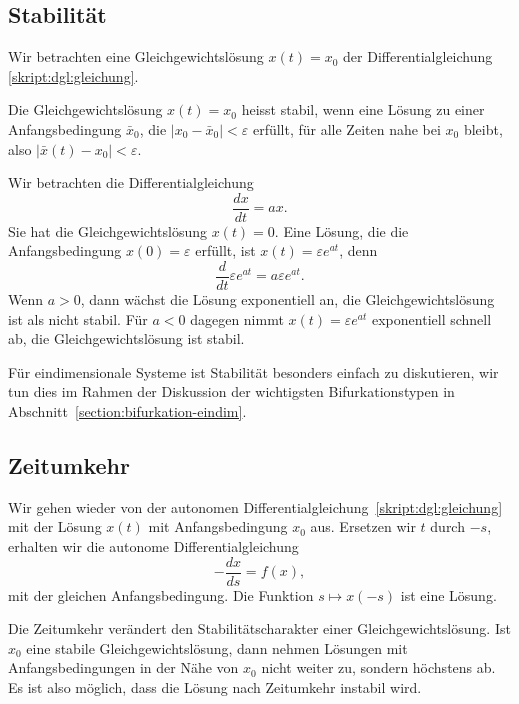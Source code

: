\subsection{Stabilität}
Wir betrachten eine Gleichgewichtslösung $x(t)=x_0$ der Differentialgleichung
\eqref{skript:dgl:gleichung}.
\begin{definition}
Die Gleichgewichtslösung $x(t)=x_0$ heisst stabil, wenn eine Lösung zu
einer Anfangsbedingung $\bar x_0$, die $|x_0-\bar x_0|<\varepsilon$
erfüllt, für alle Zeiten nahe bei $x_0$ bleibt, also
$|\bar x(t)- x_0|<\varepsilon$.
\end{definition}
%

\begin{beispiel}
Wir betrachten die Differentialgleichung
\[
\frac{dx}{dt} = ax.
\]
Sie hat die Gleichgewichtslösung $x(t)=0$.
Eine Lösung, die die Anfangsbedingung $x(0)=\varepsilon$ erfüllt, 
ist $x(t)=\varepsilon e^{at}$, denn
\[
\frac{d}{dt}
\varepsilon e^{at}
=
a\varepsilon e^{at}.
\]
Wenn $a>0$, dann wächst die Lösung exponentiell an, die Gleichgewichtslösung 
ist als nicht stabil.
Für $a<0$ dagegen nimmt $x(t)=\varepsilon e^{at}$ exponentiell schnell ab,
die Gleichgewichtslösung ist stabil.
\end{beispiel}

Für eindimensionale Systeme ist Stabilität besonders einfach zu
diskutieren, wir tun dies im Rahmen der Diskussion der wichtigsten
Bifurkationstypen in Abschnitt~\ref{section:bifurkation-eindim}.

\subsection{Zeitumkehr}
%
Wir gehen wieder von der autonomen
Differentialgleichung~\eqref{skript:dgl:gleichung}
mit der Lösung $x(t)$ mit Anfangsbedingung $x_0$ aus.
Ersetzen wir $t$ durch $-s$, erhalten wir die autonome Differentialgleichung
\begin{equation}
-\frac{dx}{ds}
=
f(x),
\end{equation}
mit der gleichen Anfangsbedingung.
Die Funktion $s\mapsto x(-s)$ ist eine Lösung.

Die Zeitumkehr verändert den Stabilitätscharakter einer Gleichgewichtslösung.
Ist $x_0$ eine stabile Gleichgewichtslösung, dann nehmen Lösungen mit
Anfangsbedingungen in der Nähe von $x_0$ nicht weiter zu, sondern
höchstens ab.
Es ist also möglich, dass die Lösung nach Zeitumkehr instabil wird.

